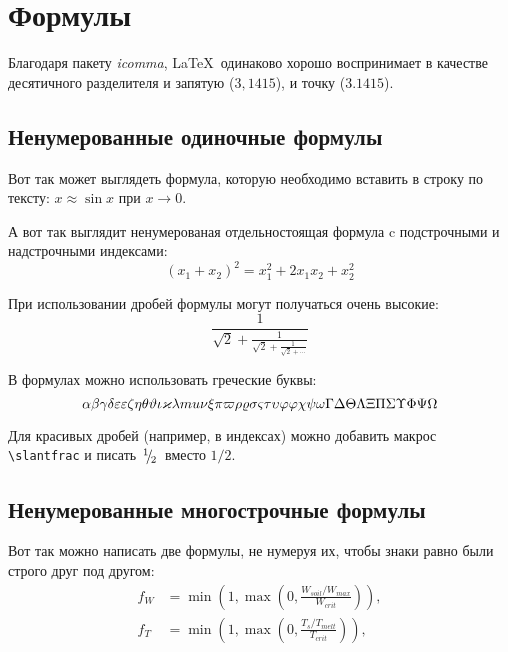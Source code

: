 \section{Формулы} \label{sect1_3}

Благодаря пакету \textit{icomma}, \LaTeX~одинаково хорошо воспринимает в качестве десятичного разделителя и запятую ($3,1415$), и точку ($3.1415$).

\subsection{Ненумерованные одиночные формулы} \label{subsect1_3_1}

Вот так может выглядеть формула, которую необходимо вставить в строку по тексту: $x \approx \sin x$ при $x \to 0$.

А вот так выглядит ненумерованая отдельностоящая формула c подстрочными и надстрочными индексами:
\[
(x_1+x_2)^2 = x_1^2 + 2 x_1 x_2 + x_2^2
\]

При использовании дробей формулы могут получаться очень высокие:
\[
  \frac{1}{\sqrt{2}+
  \displaystyle\frac{1}{\sqrt{2}+
  \displaystyle\frac{1}{\sqrt{2}+\cdots}}}
\]

В формулах можно использовать греческие буквы:
\[
\alpha\beta\gamma\delta\epsilon\varepsilon\zeta\eta\theta\vartheta\iota\kappa\lambda\\mu\nu\xi\pi\varpi\rho\varrho\sigma\varsigma\tau\upsilon\phi\varphi\chi\psi\omega\Gamma\Delta\Theta\Lambda\Xi\Pi\Sigma\Upsilon\Phi\Psi\Omega
\]

Для красивых дробей (например, в индексах) можно добавить макрос
\verb+\slantfrac+ и писать $\slantfrac{1}{2}$ вместо $1/2$.

\subsection{Ненумерованные многострочные формулы} \label{subsect1_3_2}

Вот так можно написать две формулы, не нумеруя их, чтобы знаки равно были строго друг под другом:
\begin{align}
  f_W & =  \min \left( 1, \max \left( 0, \frac{W_{soil} / W_{max}}{W_{crit}} \right)  \right), \nonumber \\
  f_T & =  \min \left( 1, \max \left( 0, \frac{T_s / T_{melt}}{T_{crit}} \right)  \right), \nonumber
\end{align}

